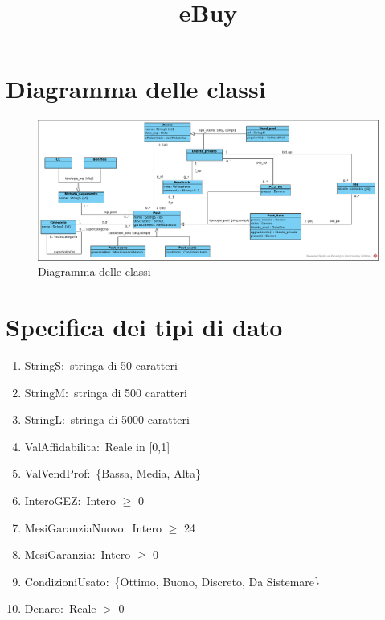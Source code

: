\documentclass{article}
\title{eBuy}
\author{}
\date{}
\begin{document}
\maketitle

\tableofcontents

\newpage

\section{\label{sec:DiagrammaDelleClassi}Diagramma delle classi}
\begin{figure}[h]
    \centering
    \includegraphics[width=1\textwidth]{../Diagrammi/diagramma delle classi.pdf}
    \caption{Diagramma delle classi}
\end{figure}

\newpage
\section{\label{Sec:SpecificaTipoDiDato}Specifica dei tipi di dato}

\begin{enumerate}
    \item\label{sec:TipoStringS}StringS$: $ stringa di 50 caratteri
    \item\label{sec:TipoStringM}StringM$: $ stringa di 500 caratteri
    \item\label{sec:TipoStringL}StringL$: $ stringa di 5000 caratteri
    \item\label{sec:TipoValAffidabilita}ValAffidabilita$: $ Reale in [0,1]
    \item\label{sec:TipoValVendProf}ValVendProf$: $ \{Bassa, Media, Alta\}
    \item\label{sec:TipoInteroGEZ}InteroGEZ$: $ Intero $\geq$ 0
    \item\label{sec:TipoMesiGaranziaNuovo}MesiGaranziaNuovo$: $ Intero $\geq$ 24
    \item\label{sec:TipoMesiGaranzia}MesiGaranzia$: $ Intero $\geq$ 0
    \item\label{sec:TipoCondizioniUsato}CondizioniUsato$: $ \{Ottimo, Buono, Discreto, Da Sistemare\}
    \item\label{sec:TipoDenaro}Denaro$: $ Reale $>$ 0
\end{enumerate}
\end{document}
